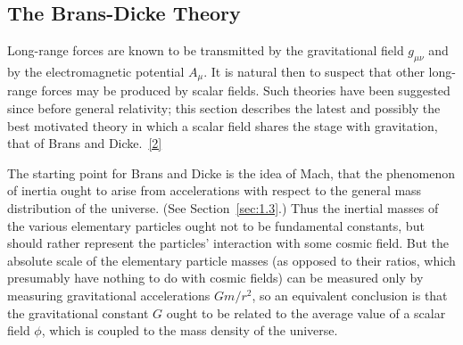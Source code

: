 
\subsection{The Brans-Dicke Theory}\label{sec:7.3}

Long-range forces are known to be transmitted by the gravitational field
\(g_{\mu\nu}\) and by the electromagnetic potential \(A_\mu\). It is natural
then to suspect that other long-range forces may be produced by scalar fields.
Such theories have been suggested since before general relativity; this
section describes the latest and possibly the best motivated theory in which
a scalar field shares the stage with gravitation, that of Brans and
Dicke.~\hyperref[ch7-ref-2]{[2]}

The starting point for Brans and Dicke is the idea of Mach, that the
phenomenon of inertia ought to arise from accelerations with respect to the
general mass distribution of the universe. (See Section~\ref{sec:1.3}.)
Thus the inertial masses of the various elementary particles ought not to be
fundamental constants, but should rather represent the particles' interaction
with some cosmic field. But the absolute scale of the elementary particle
masses (as opposed to their ratios, which presumably have nothing to do with
cosmic fields) can be measured only by measuring gravitational accelerations
\(Gm/r^2\), so an equivalent conclusion is that the gravitational constant
\(G\) ought to be related to the average value of a scalar field \(\phi\),
which is coupled to the mass density of the universe.

